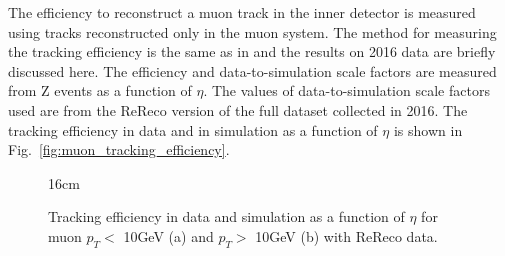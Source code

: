 The efficiency to reconstruct a muon track in the inner detector is measured using tracks reconstructed only in the muon system. The method for measuring the tracking efficiency is the same as in \cite{bib:CMS-AN-15-215} and the results on 2016 data are briefly discussed here. The efficiency and data-to-simulation scale factors are measured from Z events as a function of $\eta$. The values of data-to-simulation scale factors used are from the ReReco version of the full dataset collected in 2016. The tracking efficiency in data and in simulation as a function of $\eta$ is shown in Fig.~\ref{fig:muon_tracking_efficiency}.

\begin{figure}[hbtp]{16cm}
	\caption{Tracking efficiency in data and simulation as a function of $\eta$ for muon $p_{T}<$ 10GeV (a) and $p_{T}>$ 10GeV (b) with ReReco data.}
	\centering
	\quad

\end{figure}
